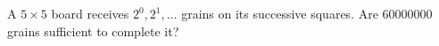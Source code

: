 A $5\times5$ board receives $2^0,2^1,\ldots$ grains on its successive squares. Are 60000000 grains sufficient to complete it?
